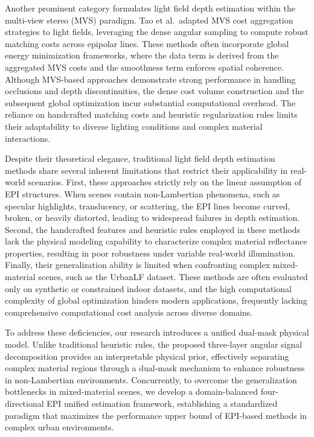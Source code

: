 \documentclass[lettersize,journal]{IEEEtran}
\begin{document}
Another prominent category formulates light field depth estimation within the multi-view stereo (MVS) paradigm. Tao et al.\ adapted MVS cost aggregation strategies to light fields, leveraging the dense angular sampling to compute robust matching costs across epipolar lines. These methods often incorporate global energy minimization frameworks, where the data term is derived from the aggregated MVS costs and the smoothness term enforces spatial coherence. Although MVS-based approaches demonstrate strong performance in handling occlusions and depth discontinuities, the dense cost volume construction and the subsequent global optimization incur substantial computational overhead. The reliance on handcrafted matching costs and heuristic regularization rules limits their adaptability to diverse lighting conditions and complex material interactions.

Despite their theoretical elegance, traditional light field depth estimation methods share several inherent limitations that restrict their applicability in real-world scenarios. First, these approaches strictly rely on the linear assumption of EPI structures. When scenes contain non-Lambertian phenomena, such as specular highlights, translucency, or scattering, the EPI lines become curved, broken, or heavily distorted, leading to widespread failures in depth estimation. Second, the handcrafted features and heuristic rules employed in these methods lack the physical modeling capability to characterize complex material reflectance properties, resulting in poor robustness under variable real-world illumination. Finally, their generalization ability is limited when confronting complex mixed-material scenes, such as the UrbanLF dataset. These methods are often evaluated only on synthetic or constrained indoor datasets, and the high computational complexity of global optimization hinders modern applications, frequently lacking comprehensive computational cost analysis across diverse domains.

To address these deficiencies, our research introduces a unified dual-mask physical model. Unlike traditional heuristic rules, the proposed three-layer angular signal decomposition provides an interpretable physical prior, effectively separating complex material regions through a dual-mask mechanism to enhance robustness in non-Lambertian environments. Concurrently, to overcome the generalization bottlenecks in mixed-material scenes, we develop a domain-balanced four-directional EPI unified estimation framework, establishing a standardized paradigm that maximizes the performance upper bound of EPI-based methods in complex urban environments.
\end{document}
